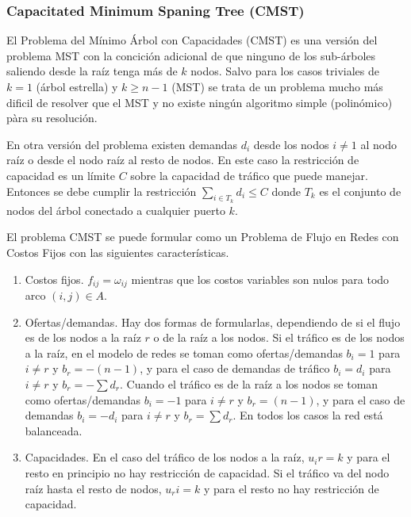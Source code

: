 \subsubsection{Capacitated Minimum Spaning Tree (CMST)}

El Problema del Mínimo Árbol con Capacidades (CMST) es una versión del problema MST con la concición adicional de que ninguno
de los sub-árboles saliendo desde la raíz tenga más de $k$ nodos. Salvo para los casos triviales de $k=1$ (árbol estrella) y 
$k\geq n-1$ (MST) se trata de un problema mucho más dificil de resolver que el MST y no existe ningún algoritmo simple
(polinómico) pàra su resolución.


En otra versión del problema existen demandas $d_i$ desde los nodos $i\neq 1$ al nodo raíz o desde el nodo raíz al resto de
nodos. En este caso la restricción de capacidad es un límite $C$ sobre la capacidad de tráfico que puede manejar. Entonces se
debe cumplir la restricción $\sum_{i\in T_k}d_i \leq C$ donde $T_k$ es el conjunto de nodos del árbol conectado a cualquier
puerto $k$.

\vspace*{2mm}

El problema CMST se puede formular como un Problema de Flujo en Redes con Costos Fijos con las siguientes características.
\begin{enumerate}
    \item Costos fijos. $f_{ij}=\omega_{ij}$ mientras que los costos variables son nulos para todo arco $(i,j)\in A$.
    \item Ofertas/demandas. Hay dos formas de formularlas, dependiendo de si el flujo es de los nodos a la raíz $r$ o de la 
    raíz a los nodos. Si el tráfico es de los nodos a la raíz, en el modelo de redes se toman como ofertas/demandas $b_i=1$
    para $i\neq r$ y $b_r=-(n-1)$, y para el caso de demandas de tráfico $b_i=d_i$ para $i\neq r$ y $b_r=-\sum d_r$. Cuando el
    tráfico es de la raíz a los nodos se toman como ofertas/demandas $b_i=-1$ para $i\neq r$ y $b_r=(n-1)$, y para el caso de
    demandas $b_i=-d_i$ para $i\neq r$ y $b_r=\sum d_r$. En todos los casos la red está balanceada.
    \item Capacidades. En el caso del tráfico de los nodos a la raíz, $u_ir=k$ y para el resto en principio no hay restricción
    de capacidad. Si el tráfico va del nodo raíz hasta el resto de nodos, $u_ri=k$ y para el resto no hay restricción de
    capacidad.
\end{enumerate}


